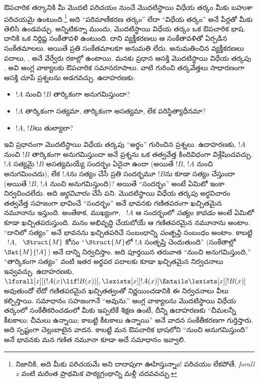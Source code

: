 \documentclass[../../../include/open-logic-section]{subfiles}
\begin{document}


ఔపచారిక తర్కానికి మీ మొదటి పరిచయం నుంచే మొదటిస్థాయి విధేయ తర్కం మీకు
బహుశా పరిచయమై ఉంటుంది.\footnote{నిజానికి, అది మీకు పరిచయమే అని
దాదాపుగా ఊహిస్తున్నాం!{} పరిచయం లేకపోతే, \emph{forall x}
\citep{Magnus2021} వంటి మరింత ప్రాథమిక పాఠ్యగ్రంథాన్ని మళ్లీ చదవవచ్చు.} అది ``పరిమాణీకరణ తర్కం'' లేదా ``విధేయ తర్కం'' అనే పేర్లతో
మీకు తెలిసి ఉండవచ్చు. అన్నిటికన్నా ముందు, మొదటిస్థాయి విధేయ తర్కం ఒక
ఔపచారిక భాష. దానికి ఒక నిర్దిష్ట సంకేతావళి ఉంటుంది. దాని
వ్యక్తీకరణలు ఆ సంకేతావళితో ఏర్పడిన సంకేతమాలలు. అయితే ప్రతి
సంకేతమాలకూ అనుమతి లేదు. అనుమతించిన వ్యక్తీకరణలు పదాలు,
,  అనే వేర్వేరు రకాల్లో ఉంటాయి. మనకు ప్రధాన
ఆసక్తి మొదటిస్థాయి విధేయ తర్కపు . అవి ఆంగ్ల వాక్యాలకు ఔపచారిక సమానరూపాలు. వాటి గురించి తర్కవేత్తలు
సాధారణంగా ఆసక్తి చూపే ప్రశ్నలను అడగవచ్చు. ఉదాహరణకు:
\begin{itemize}
    \item $!A$ నుంచి $!B$ తార్కికంగా అనుగమిస్తుందా?
    \item $!A$ తార్కికంగా సత్యమా, తార్కికంగా అసత్యమా, లేక
    పరిస్థిత్యాధీనమా?
    \item $!A$, $!B$లు తుల్యాలా?
\end{itemize}

ఇవి ప్రధానంగా మొదటిస్థాయి విధేయ తర్కపు  ``అర్థం'' గురించిన
ప్రశ్నలు. ఉదాహరణకు, $!A$ నుంచి $!B$ తార్కికంగా అనుగమిస్తుందా అనే
ప్రశ్నను ఒక తత్వవేత్త కిందివిధంగా విశ్లేషించవచ్చు. $!A$ సత్యమై $!B$ అసత్యమయ్యే
సందర్భం ఏదైనా ఉందా (అయితే $!B$, $!A$ నుంచి అనుగమించదు), లేక $!A$ను
సత్యం చేసే ప్రతి సందర్భమూ $!B$ను కూడా సత్యం చేస్తుందా (అయితే $!B$,
$!A$ నుంచి అనుగమిస్తుంది)? అయితే ``సందర్భం'' అంటే ఏమిటో ఇంకా నిర్వచించలేదు. అది \emph{అర్థవిచారం} చేసే పని. మొదటిస్థాయి విధేయ తర్కపు
అర్థవిచారం తత్వవేత్త సహజంగా భావించే ``సందర్భం'' అనే భావనకు గణితపరంగా
ఖచ్చితమైన నమూనాను ఇస్తుంది. అంతేకాక, ముఖ్యంగా,
~$!A$ ఆ సందర్భంలో \emph{సత్యం కావడం} అంటే ఏమిటో కూడా
ఖచ్చితపరుస్తుంది. మనం అభివృద్ధి చేయబోయే ఆ గణితపరమైన నమూనాను
 అంటాం. ``దానిలో సత్యం'' అనే భావనను ఖచ్చితపరిచే
సంబంధాన్ని \emph{సంతృప్తి} సంబంధం అంటాం. కాబట్టి ~$!A$,
~$\Struct{M}$ కోసం ``$\Struct{M}$లో $!A$ సంతృప్తి
చెందుతుంది'' (సంకేతాల్లో $\Sat{M}{!A}$) అనే దాన్ని నిర్వచిస్తాం.
అది పూర్తయిన తరువాత ``నుంచి అనుగమిస్తుంది,'' ``తార్కికంగా సత్యం''
వంటి ఇతర అర్థపర పదాలకు కూడా ఖచ్చితమైన నిర్వచనాలు ఇవ్వవచ్చు.
ఉదాహరణకు,
$\lforall[x][(!A(x) \lif !B(x))], \lexists[x][!A(x)] \Entails
\lexists[x][!B(x)]$ అవుతుందో లేదో గణితపరమైన ఖచ్చితత్వంతో నిర్ణయించడానికి
ఈ నిర్వచనాలు వీలు కల్పిస్తాయి. సమాధానం సహజంగానే ``అవును.'' ఆంగ్ల
వాక్యాలను మొదటిస్థాయి విధేయ తర్కంలో సంకేతీకరించడంలో మీకు ఇప్పటికే శిక్షణ
ఉంటే, దీన్ని ఉదాహరణకు ``చీమలన్నీ కీటకాలు; చీమలు ఉన్నాయి; కాబట్టి
కీటకాలు ఉన్నాయి'' అనే వాదన సంకేతీకరణగా గుర్తిస్తారు. అది స్పష్టంగా
చెల్లుబాటైన వాదన. కాబట్టి మన ఔపచారిక భాషలోని ``నుంచి అనుగమిస్తుంది''
అనే భావనకు మన గణిత నమూనా కూడా అదే సమాధానం ఇవ్వాలి.
\end{document}
